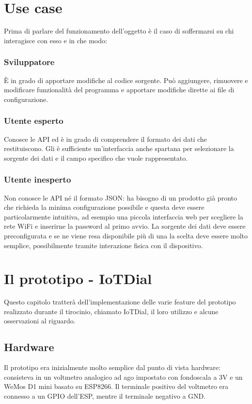 \documentclass[12pt,a4paper]{report}
\begin{document}
\chapter{Use case}
Prima di parlare del funzionamento dell'oggetto è il caso di soffermarsi su chi interagisce con esso e in che modo:  %
\subsection*{Sviluppatore}
È in grado di apportare modifiche al codice sorgente. Può aggiungere, rimuovere e  modificare funzionalità del programma
e apportare modifiche dirette ai file di configurazione.
\subsection*{Utente esperto}
Conosce le API ed è in grado di comprendere il formato dei dati che restituiscono. Gli è sufficiente un'interfaccia anche spartana
per selezionare la sorgente dei dati e il campo specifico che vuole rappresentato.
\subsection*{Utente inesperto}
Non conosce le API né il formato JSON: ha bisogno di un prodotto già pronto che richieda la minima configurazione possibile e questa
deve essere particolarmente intuitiva, ad esempio una piccola interfaccia web per scegliere la rete WiFi e inserirne la password
al primo avvio. La sorgente dei dati deve essere preconfigurata e se ne viene resa disponibile più di una la scelta deve essere molto
semplice, possibilmente tramite interazione fisica con il dispositivo.




\chapter{Il prototipo - IoTDial}
Questo capitolo tratterà dell'implementazione delle varie feature del prototipo realizzato durante il tirocinio, chiamato IoTDial,
il loro utilizzo e alcune osservazioni al riguardo.

\section{Hardware}
Il prototipo era inizialmente molto semplice dal punto di vista hardware: consisteva in un voltmetro analogico ad ago impostato con
fondoscala a 3V e un WeMos D1 mini basato su ESP8266. Il terminale positivo del voltmetro era connesso a un GPIO dell'ESP,
mentre il terminale negativo a GND.
\end{document}
